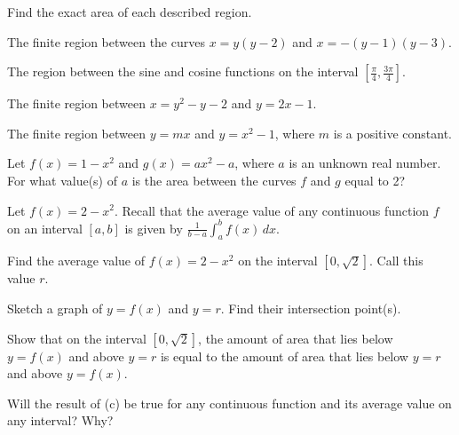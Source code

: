 \begin{exercises} 
  \item Find the exact area of each described region.
  	\ba 
		\item The finite region between the curves $x = y(y-2)$ and $x=-(y-1)(y-3)$.
		\item The region between the sine and cosine functions on the interval $[\frac{\pi}{4}, \frac{3\pi}{4}]$.
		\item The finite region between $x = y^2 - y - 2$ and $y = 2x-1$.
		\item The finite region between $y = mx$ and $y = x^2-1$, where $m$ is a positive constant.
	\ea
    
   \item Let $f(x) = 1-x^2$ and $g(x) = ax^2 - a$, where $a$ is an unknown real number.  For what value(s) of $a$ is the area between the curves $f$ and $g$ equal to 2?
   
    
   \item Let $f(x) = 2-x^2$.  Recall that the average value of any continuous function $f$ on an interval $[a,b]$ is given by $\frac{1}{b-a} \int_a^b f(x) \, dx$.
   	\ba
		\item Find the average value of $f(x) = 2-x^2$ on the interval $[0,\sqrt{2}]$.  Call this value $r$.
		\item Sketch a graph of $y = f(x)$ and $y = r$.  Find their intersection point(s).
		\item Show that on the interval $[0,\sqrt{2}]$, the amount of area that lies below $y = f(x)$ and above $y = r$ is equal to the amount of area that lies below $y = r$ and above $y = f(x)$.
		\item Will the result of (c) be true for any continuous function and its average value on any interval?  Why?
	\ea
   
\end{exercises}
\afterexercises
